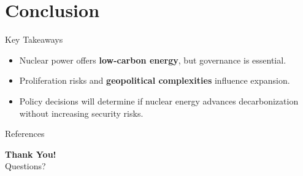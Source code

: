 \documentclass{beamer}
\begin{document}
\section{Conclusion}
\begin{frame}{Key Takeaways}
    \begin{itemize}
        \item Nuclear power offers \textbf{low-carbon energy}, but governance is essential.
        \item Proliferation risks and \textbf{geopolitical complexities} influence expansion.
        \item Policy decisions will determine if nuclear energy advances decarbonization without increasing security risks.
    \end{itemize}
\end{frame}


\begin{frame}[allowframebreaks]{References}
    
    
\end{frame}


\begin{frame}
    \centering
    \textbf{Thank You!} \\
    Questions?
\end{frame}
\end{document}
